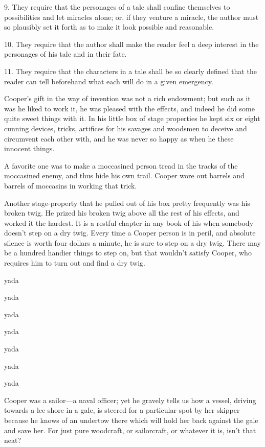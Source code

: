 \documentclass[../interior-demo.tex]{subfiles}
\begin{document}
9. They require that the personages of a tale shall confine themselves
to possibilities and let miracles alone; or, if they venture a miracle,
the author must so plausibly set it forth as to make it look possible
and reasonable.

10. They require that the author shall make the reader feel a deep
interest in the personages of his tale and in their fate.

11. They require that the characters in a tale shall be so
clearly defined that the reader can tell beforehand what each will do in a
given emergency.

Cooper's gift in the way of invention was not a rich endowment; but
such as it was he liked to work it, he was pleased with the effects,
and indeed he did some quite sweet things with it. In his little box of
stage properties he kept six or eight cunning devices, tricks, artifices
for his savages and woodsmen to deceive and circumvent each other with,
and he was never so happy as when he these
innocent things.

A favorite one was to make a moccasined person tread
in the tracks of the moccasined enemy, and thus hide his own trail.
Cooper wore out barrels and barrels of moccasins in working that trick.

Another stage-property that he pulled out of his box pretty frequently
was his broken twig. He prized his broken twig above all the rest of his
effects, and worked it the hardest. It is a restful chapter in any book
of his when somebody doesn't step on a dry twig. Every time a Cooper person is
in peril, and absolute silence is worth four dollars a minute, he is
sure to step on a dry twig. There may be a hundred handier things to
step on, but that wouldn't satisfy Cooper, who requires him to turn
out and find a dry twig.

yada

yada

yada

yada

yada

yada

yada


Cooper was a sailor---a naval officer; yet he gravely tells us how
a vessel, driving towards a lee shore in a gale, is steered for a
particular spot by her skipper because he knows of an undertow there
which will hold her back against the gale and save her. For just pure
woodcraft, or sailorcraft, or whatever it is, isn't that neat?
\end{document}
